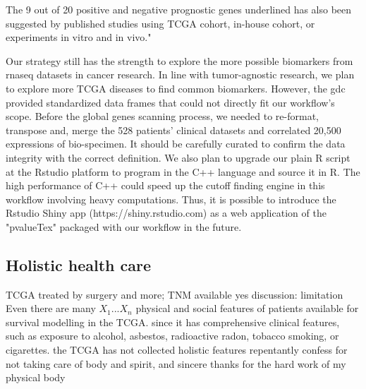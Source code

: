 \documentclass[jpm,article,submit,moreauthors,pdftex]{Definitions/mdpi}
\begin{document}
\begin{paracol}{2}

The 9 out of 20 positive and negative prognostic genes underlined has also been suggested by published studies using TCGA cohort, in-house cohort, or experiments in vitro and in vivo."







Our strategy still has the strength to explore the more possible biomarkers from \acrshort{rnaseq} datasets in cancer research.
In line with tumor-agnostic research, we plan to explore more TCGA diseases to find common biomarkers. However, the \acrshort{gdc} provided standardized data frames that could not directly fit our workflow's scope. Before the global genes scanning process, we needed to re-format, transpose and, merge the 528 patients' clinical datasets and correlated 20,500 expressions of bio-specimen. It should be carefully curated to confirm the data integrity with the correct definition. We also plan to upgrade our plain R script at the Rstudio platform to program in the C++ language and source it in R. The high performance of C++ could speed up the cutoff finding engine in this workflow involving heavy computations\cite{Woodward2020}. Thus, it is possible to introduce the Rstudio Shiny app (https://shiny.rstudio.com) as a web application of the "pvalueTex" packaged with our workflow in the future.

\subsection{Holistic health care}
TCGA treated by surgery and more; TNM available yes
discussion: limitation
Even there are many $X_1 ... X_n$ physical and social features of patients available for survival modelling in the TCGA.
 since it has comprehensive clinical features, such as exposure to alcohol, asbestos, radioactive radon, tobacco smoking, or cigarettes.
the TCGA has not collected holistic features
repentantly confess for not taking care of body and spirit, and sincere thanks for the hard work of my physical body


\end{paracol}
\end{document}
